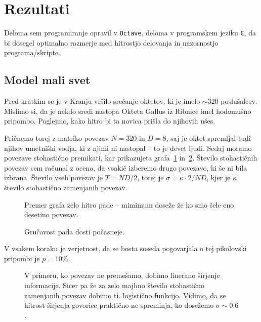 \documentclass[a4 paper, 12pt]{article}
\begin{document}
\section{Rezultati}

Deloma sem programiranje opravil v {\tt Octave}, deloma v programskem jeziku {\tt C}, da bi dosegel optimalno
razmerje med hitrostjo delovanja in nazornostjo programa/skripte.

\subsection{Model mali svet}

Pred kratkim se je v Kranju vr\v silo sre\v canje oktetov, ki je imelo $\sim 320$ poslu\v salcev. Mislimo si, da
je nekdo sredi nastopa Okteta Gallus iz Ribnice imel hodomu\v sno pripombo. Poglejmo, kako hitro bi ta novica pri\v sla
do njihovih u\v ses.

Pri\v cnemo torej z matriko povezav $N = 320$ in $D = 8$, saj je oktet spremljal tudi njihov umetni\v ski vodja, ki
z njimi ni nastopal -- to je devet ljudi. Sedaj moramo povezave stohasti\v cno premikati, kar prikazujeta grafa~\ref{gr1}
in~\ref{gr2}. \v Stevilo stohasti\v cnih povezav sem ra\v cunal z oceno, da vsaki\v c izberemo drugo povezavo, ki \v se
ni bila izbrana. \v Stevilo vseh povezav je $T = ND/2$, torej je $\sigma = \kappa \cdot 2/ND$, kjer je $\kappa$ \v stevilo
stohasti\v cno zamenjanih povezav.
\begin{figure}[H]\centering
	
	\caption{Premer grafa zelo hitro pade -- mimimum dose\v ze \v ze ko smo \v sele eno desetino povezav.}
	\label{gr1}
\end{figure}
\begin{figure}[H]\centering
	
	\caption{Gru\v cavost pada dosti po\v casneje.}
	\label{gr2}
\end{figure}

V vsakem koraku je verjetnost, da se bosta soseda pogovarjala o tej pikolovski pripombi je $p = 10\%$.
\begin{figure}[H]\centering
	
	\caption{V primeru, ko povezav ne preme\v samo, dobimo linerano \v sirjenje informacije. Sicer
		pa \v ze za zelo majhno \v stevilo stohasti\v cno zamenjanih povezav dobimo ti. logisti\v cno funkcijo.
		Vidimo, da se hitrost \v sirjenja govorice prakti\v cno ne spreminja, ko dose\v zemo $\sigma \sim 0.6$.}
	\label{gr3}
\end{figure}
\end{document}
